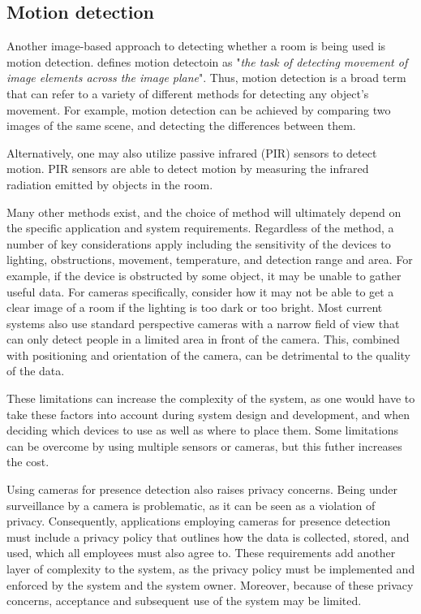 
\subsection{Motion detection}
Another image-based approach to detecting whether a room is being used is motion detection.
\citeauthor{ANANDAN1988347}\cite{ANANDAN1988347} defines motion detectoin as "\textit{the task of detecting movement of image elements across the image plane}".
Thus, motion detection is a broad term that can refer to a variety of different methods for detecting any object's movement. 
For example, motion detection can be achieved by comparing two images of the same scene, and detecting the differences between them\cite{granath_detecting_nodate}.

Alternatively, one may also utilize passive infrared (PIR) sensors to detect motion.
PIR sensors are able to detect motion by measuring the infrared radiation emitted by objects in the room.\cite{Deiana2014}

Many other methods exist, and the choice of method will ultimately depend on the specific application and system requirements. 
Regardless of the method, a number of key considerations apply including the sensitivity of the devices to lighting, obstructions, movement, temperature, and detection range and area.
For example, if the device is obstructed by some object, it may be unable to gather useful data.
For cameras specifically, consider how it may not be able to get a clear image of a room if the lighting is too dark or too bright.
Most current systems also use standard perspective cameras with a narrow field of view that can only detect people in a limited area in front of the camera\cite{FUERTES2022103473}.
This, combined with positioning and orientation of the camera, can be detrimental to the quality of the data.\cite{granath_detecting_nodate, tang_occupancy_2020}

These limitations can increase the complexity of the system, as one would have to take these factors into account during system design and development, and when deciding which devices to use as well as where to place them.
Some limitations can be overcome by using multiple sensors or cameras, but this futher increases the cost.\cite{FUERTES2022103473}

Using cameras for presence detection also raises privacy concerns.
Being under surveillance by a camera is problematic, as it can be seen as a violation of privacy.
Consequently, applications employing cameras for presence detection must include a privacy policy that outlines how the data is collected, stored, and used, which all employees must also agree to.
These requirements add another layer of complexity to the system, as the privacy policy must be implemented and enforced by the system and the system owner.
Moreover, because of these privacy concerns, acceptance and subsequent use of the system may be limited.\cite{granath_detecting_nodate, tang_occupancy_2020, PrivacyPreservingSensor}